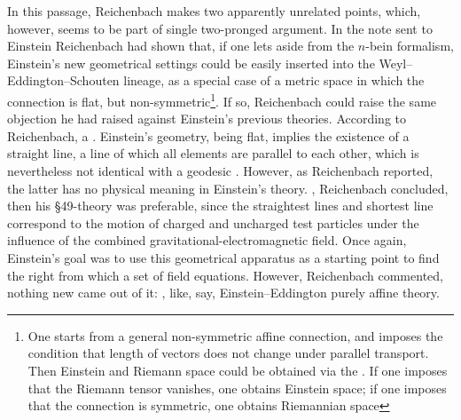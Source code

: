 \documentclass[draft]{article}
\newcommand{\manu}[1]{\citep[#1]{Reichenbach1928b}}
\newcommand{\nbein}{$n$-bein\xspace}
\begin{document}
In this passage, Reichenbach makes two apparently unrelated points, which, however, seems to be part of single two-pronged argument. In the note sent to Einstein Reichenbach had shown that, if one lets aside from the \nbein formalism, Einstein's new geometrical settings could be easily inserted into the Weyl--Eddington--Schouten lineage, as a special case of a metric space in which the connection is flat, but non-symmetric\footnote{One starts from a general non-symmetric affine \Gtmn connection, and imposes the condition that length of vectors does not change under parallel transport. Then Einstein and Riemann space could be obtained via the  \manu{5}. If one imposes that the Riemann tensor vanishes, one obtains Einstein space; if one imposes that the connection is symmetric, one obtains Riemannian space}. If so, Reichenbach could raise the same objection he had raised against Einstein's previous theories. According to Reichenbach, a  \manu{7}. Einstein's geometry, being flat, implies the existence of a straight line, a line of which all elements are parallel to each other, which is nevertheless not identical with a geodesic \citep[224]{Einstein19282}. However, as Reichenbach reported, the latter has no physical meaning in Einstein's theory.  , Reichenbach concluded, then his \S49-theory was preferable, since the straightest lines and shortest line correspond to the motion of charged and uncharged test particles under the influence of the combined gravitational-electromagnetic field. Once again, Einstein's goal was to use this geometrical apparatus as a starting point to find the right  from which a set of field equations. However, Reichenbach commented, nothing new came out of it:  \manu{6}, like, say, Einstein--Eddington purely affine theory. 



\end{document}
